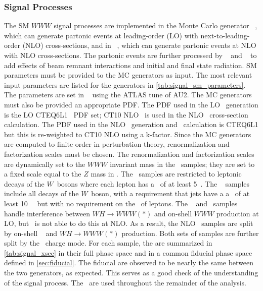 \subsubsection{Signal Processes}
\label{sec:signal}



The SM $WWW$ signal processes are implemented in the Monte
Carlo generator \vbfnlo~\cite{Arnold:2011wj,Arnold:2012xn},
which can generate partonic events at leading-order (LO) with
next-to-leading-order (NLO) cross-sections, 
and in \madgraph~\cite{MadGraph}, which can generate
partonic events at NLO with NLO cross-sections. 
The partonic events are further processed 
by \pythiaeight~\cite{Sjostrand:2007gs} and \photos~\cite{Golonka:2005pn} 
to add effects of beam remnant interactions and initial and 
final state radiation. 
SM parameters must be provided to the MC generators as input. 
The most relevant input parameters are listed 
for the generators in \tab\ref{tab:signal_sm_parameters}.
The parameters are set in \pythiaeight~ using the ATLAS tune 
of AU2\cite{atlas:2011zja}.
The MC generators must also be provided an appropriate PDF.
The PDF used  in the LO \vbfnlo~generation is
the LO CTEQ6L1~\cite{Pumplin:2002vw} PDF set;
CT10 NLO~\cite{guzzi:2011sv}
is used in the NLO \vbfnlo~cross-section calculation.
The PDF used in the NLO \madgraph~generation 
and \xsec~calculation is CTEQ6L1 
but this is re-weighted to CT10 NLO using a k-factor.
Since the MC generators are computed to finite order in perturbation
theory, renormalization and factorization scales must be chosen.
The renormalization and factorization scales are dynamically
set to the $WWW$ invariant mass in the \vbfnlo~samples; they 
are set to a fixed scale equal to the $Z$ mass in \madgraph.
The \vbfnlo~samples are restricted to leptonic decays of the $W$~bosons
where each lepton has a \pt~of at least 5~\GeV. The \madgraph~
samples include all decays of the $W$~boson, with a requirement 
that jets have a a \pt~of at least 10~\GeV~ but with no requirement
on the \pt~of leptons.
The \vbfnlo~ and \madgraph~samples handle interference 
between $WH\rightarrow WWW(*)$ 
and on-shell $WWW$ production at LO, but \madgraph~is not
able to do this at NLO. As a result, the NLO \madgraph~samples
are split by on-shell \www~ and $WH\rightarrow WWW(*)$ production.
Both sets of samples are further split by the \www~charge mode.
For each sample, the \xsecs are summarized in \tab\ref{tab:signal_xsec} 
in their full phase space and in a common fiducial phase space
defined in \sec\ref{sec:fiducial}.  
The fiducial \xsecs are observed to be nearly the same
between the two generators,
as expected.  This serves as a good check of the understanding of the 
signal process. The \madgraph~\xsecs are used throughout the 
remainder of the analysis.

